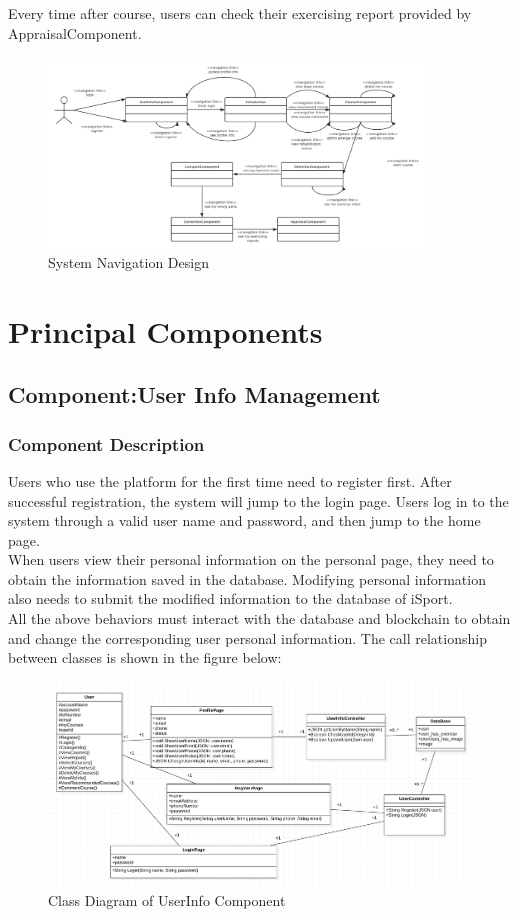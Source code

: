 \documentclass[16pt]{scrreprt}
\begin{document}
\noindent Every time after course, users can check their exercising report provided by AppraisalComponent.  
\begin{figure}[H]
  \centering
  \includegraphics[width=0.9\textwidth]{diagrams/navigation.png}
  \caption{System Navigation Design}
\end{figure}

\chapter{Principal Components}
	
\section{Component:User Info Management}
\subsection{Component Description}
Users who use the platform for the first time need to register first. After successful registration, the system will jump to the login page. Users log in to the system through a valid user name and password, and then jump to the home page.\\

\noindent When users view their personal information on the personal page, they need to obtain the information saved in the database. Modifying personal information also needs to submit the modified information to the database of iSport.\\

\noindent All the above behaviors must interact with the database and blockchain to obtain and change the corresponding user personal information. The call relationship between classes is shown in the figure below:
\begin{figure}[H]
	\centering
	\includegraphics[width=1.0\textwidth]{diagrams/userinfo.png}
	\caption{Class Diagram of UserInfo Component}
\end{figure}
\end{document}
